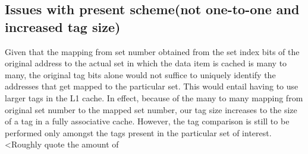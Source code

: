 \subsection{Issues with present scheme(not one-to-one and increased tag size)}
Given that the mapping from set number obtained from the set index bits of the original address to the actual set in which the data item is cached is many to many, the original tag bits alone would not suffice to uniquely identify the addresses that get mapped to the particular set. This would entail having to use larger tags in the L1 cache. In effect, because of the many to many mapping from original set number to the mapped set number, our tag size increases to the size of a tag in a fully associative cache. However, the tag comparison is still to be performed only amongst the tags present in the particular set of interest.   <Roughly quote the amount of 

